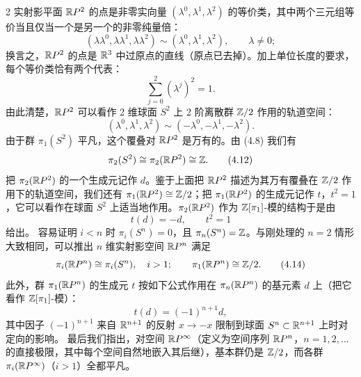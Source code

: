 \begin{example}{2}
实射影平面 $\mathbb{R}P^2$ 的点是非零实向量 $(\lambda^0,\lambda^1,\lambda^2)$ 的等价类，其中两个三元组等价当且仅当一个是另一个的非零纯量倍：
\[
  (\lambda\lambda^0,\lambda\lambda^1,\lambda\lambda^2)\sim(\lambda^0,\lambda^1,\lambda^2),
  \qquad \lambda\ne0;
\]
换言之，$\mathbb{R}P^2$ 的点是 $\mathbb{R}^3$ 中过原点的直线（原点已去掉）。加上单位长度的要求，每个等价类恰有两个代表：
\[
  \sum_{j=0}^2(\lambda^j)^2=1.
\]
由此清楚，$\mathbb{R}P^2$ 可以看作 2 维球面 $S^2$ 上 2 阶离散群 $\mathbb{Z}/2$ 作用的轨道空间：
\[
  (\lambda^0,\lambda^1,\lambda^2)\sim(-\lambda^0,-\lambda^1,-\lambda^2).
\]
由于群 $\pi_1(S^2)$ 平凡，这个覆叠对 $\mathbb{R}P^2$ 是万有的。由 (4.8) 我们有
\begin{equation}
  \pi_2(S^2)\cong\pi_2(\mathbb{R}P^2)\cong\mathbb{Z}. \tag{4.12}
\end{equation}
把 $\pi_2(\mathbb{R}P^2)$ 的一个生成元记作 $d$。鉴于上面把 $\mathbb{R}P^2$ 描述为其万有覆叠在 $\mathbb{Z}/2$ 作用下的轨道空间，我们还有 $\pi_1(\mathbb{R}P^2)\cong\mathbb{Z}/2$；把 $\pi_1(\mathbb{R}P^2)$ 的生成元记作 $t$，$t^2=1$，它可以看作在球面 $S^2$ 上适当地作用。$\pi_2(\mathbb{R}P^2)$ 作为 $\mathbb{Z}[\pi_1]$-模的结构于是由
\begin{equation}
  t(d)=-d,\qquad t^2=1 \tag{4.13}
\end{equation}
给出。
容易证明 $i<n$ 时 $\pi_i(S^n)=0$，且 $\pi_n(S^n)=\mathbb{Z}$。与刚处理的 $n=2$ 情形大致相同，可以推出 $n$ 维实射影空间 $\mathbb{R}P^n$ 满足
\begin{equation}
  \pi_i(\mathbb{R}P^n)\cong\pi_i(S^n),\quad i>1;\qquad
  \pi_1(\mathbb{R}P^n)\cong\mathbb{Z}/2. \tag{4.14}
\end{equation}
此外，群 $\pi_1(\mathbb{R}P^n)$ 的生成元 $t$ 按如下公式作用在 $\pi_n(\mathbb{R}P^n)$ 的基元素 $d$ 上（把它看作 $\mathbb{Z}[\pi_1]$-模）：
\begin{equation}
  t(d)=(-1)^{n+1}d, \tag{4.15}
\end{equation}
其中因子 $(-1)^{n+1}$ 来自 $\mathbb{R}^{n+1}$ 的反射 $x\to-x$ 限制到球面 $S^n\subset\mathbb{R}^{n+1}$ 上时对定向的影响。
最后我们指出，对空间 $\mathbb{R}P^\infty$（定义为空间序列 $\mathbb{R}P^n$，$n=1,2,\dots$ 的直接极限，其中每个空间自然地嵌入其后继），基本群仍是 $\mathbb{Z}/2$，而各群 $\pi_i(\mathbb{R}P^\infty)$（$i>1$）全都平凡。
\end{example}

